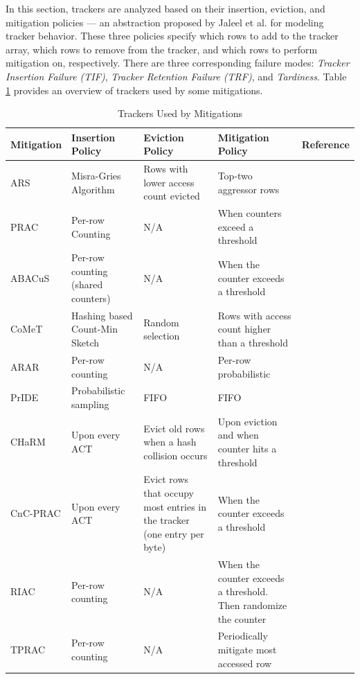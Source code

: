 \documentclass[journal,twocolumn]{IEEEtran}
\begin{document}
In this section, trackers are analyzed based on their insertion, eviction, and mitigation policies --- an abstraction proposed by Jaleel et al.\cite{Jaleel24} for modeling tracker behavior. These three policies specify which rows to add to the tracker array, which rows to remove from the tracker, and which rows to perform mitigation on, respectively. There are three corresponding failure modes: \textit{Tracker Insertion Failure (TIF)}, \textit{Tracker Retention Failure (TRF)}, and \textit{Tardiness}. Table \ref{tab:refreshcomp} provides an overview of trackers used by some mitigations.

\begin{table}
	\centering
	\caption{Trackers Used by Mitigations}\label{tab:refreshcomp}
	\def\arraystretch{1.1}
	\begin{tabular}{p{}p{}p{}p{}c}
		\toprule
		Mitigation & Insertion Policy & Eviction Policy & Mitigation Policy & Reference \\
		\midrule
		ARS & Misra-Gries Algorithm & Rows with lower access count evicted & Top-two aggressor rows & \cite{Kim23}
		\\
		PRAC & Per-row Counting & N/A & When counters exceed a threshold & \cite{JESD79-5C}
		\\
		ABACuS & Per-row counting (shared counters) & N/A & When the counter exceeds a threshold & \cite{Olgun24}
		\\
		CoMeT & Hashing based Count-Min Sketch & Random selection & Rows with access count higher than a threshold & \cite{Bostanci24}
		\\
		ARAR & Per-row counting & N/A & Per-row probabilistic & \cite{Demirseren24}
		\\
		PrIDE & Probabilistic sampling & FIFO & FIFO 
		& \cite{Jaleel24}
		\\
		CHaRM & Upon every ACT & Evict old rows when a hash collision occurs & Upon eviction and when counter hits a threshold & \cite{Hajiabadi25}
		\\
		CnC-PRAC & Upon every ACT & Evict rows that occupy most entries in the tracker (one entry per byte) & When the counter exceeds a threshold & \cite{Lin25}
		\\
		RIAC & Per-row counting & N/A & When the counter exceeds a threshold. Then randomize the counter & \cite{Bostanci25}
		\\
		TPRAC & Per-row counting & N/A & Periodically mitigate most accessed row & \cite{Woo25}
		\\

\end{tabular}
\end{table}
\end{document}
